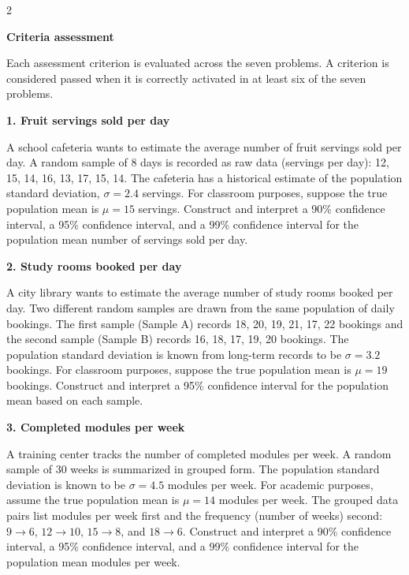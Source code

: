 \documentclass[12pt]{article}
\newcommand{\SubsectionBox}[1]{%
	\noindent\colorbox{gray!30}{%
		\parbox{\linewidth}{\textbf{#1}}%
	}\par\vspace{0.35cm}%
}
\begin{document}
	\begin{multicols}{2}
		\SubsectionBox{Criteria assessment}\vspace{-0.25cm}
		Each assessment criterion is evaluated across the seven problems. A criterion is considered passed when it is correctly activated in at least six of the seven problems.

		\vspace{0.25cm}
		\SubsectionBox{1. Fruit servings sold per day}\vspace{-0.25cm}
		A school cafeteria wants to estimate the average number of fruit servings sold per day.
		A random sample of 8 days is recorded as raw data (servings per day): 12, 15, 14, 16, 13, 17, 15, 14.
		The cafeteria has a historical estimate of the population standard deviation, \(\sigma = 2.4\) servings.
		For classroom purposes, suppose the true population mean is \(\mu = 15\) servings.
		Construct and interpret a 90\% confidence interval, a 95\% confidence interval, and a 99\% confidence interval for the population mean number of servings sold per day.

		\vspace{0.25cm}
		\SubsectionBox{2. Study rooms booked per day}\vspace{-0.25cm}
		A city library wants to estimate the average number of study rooms booked per day.
		Two different random samples are drawn from the same population of daily bookings.
		The first sample (Sample A) records 18, 20, 19, 21, 17, 22 bookings and the second sample (Sample B) records 16, 18, 17, 19, 20 bookings.
		The population standard deviation is known from long-term records to be \(\sigma = 3.2\) bookings.
		For classroom purposes, suppose the true population mean is \(\mu = 19\) bookings.
		Construct and interpret a 95\% confidence interval for the population mean based on each sample.

		\vspace{0.25cm}
		\SubsectionBox{3. Completed modules per week}\vspace{-0.25cm}
		A training center tracks the number of completed modules per week.
		A random sample of 30 weeks is summarized in grouped form. The population standard deviation is known to be \(\sigma = 4.5\) modules per week.
		For academic purposes, assume the true population mean is \(\mu = 14\) modules per week.
		The grouped data pairs list modules per week first and the frequency (number of weeks) second: \(9 \rightarrow 6\), \(12 \rightarrow 10\), \(15 \rightarrow 8\), and \(18 \rightarrow 6\).
		Construct and interpret a 90\% confidence interval, a 95\% confidence interval, and a 99\% confidence interval for the population mean modules per week.


\end{multicols}
\end{document}
